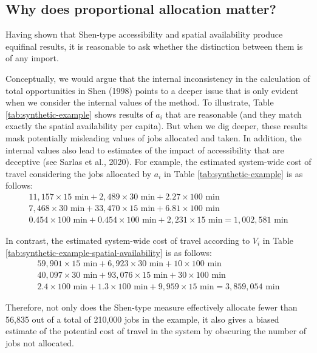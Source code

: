 \documentclass[]{elsarticle} %
\begin{document}
\hypertarget{why-does-proportional-allocation-matter}{%
\subsection{Why does proportional allocation
matter?}\label{why-does-proportional-allocation-matter}}

Having shown that Shen-type accessibility and spatial availability
produce equifinal results, it is reasonable to ask whether the
distinction between them is of any import.

Conceptually, we would argue that the internal inconsistency in the
calculation of total opportunities in Shen (1998) points to a deeper
issue that is only evident when we consider the internal values of the
method. To illustrate, Table \ref{tab:synthetic-example} shows results
of \(a_i\) that are reasonable (and they match exactly the spatial
availability per capita). But when we dig deeper, these results mask
potentially misleading values of jobs allocated and taken. In addition,
the internal values also lead to estimates of the impact of
accessibility that are deceptive (see Sarlas et al., 2020). For example,
the estimated system-wide cost of travel considering the jobs allocated
by \(a_i\) in Table \ref{tab:synthetic-example} is as follows: \[
\begin{array}{l}
11,157\times 15 \text{ min} + 2,489\times 30 \text{ min} + 2.27\times 100 \text{ min}\\
7,468\times 30 \text{ min} + 33,470\times 15 \text{ min} + 6.81\times 100 \text{ min}\\
0.454\times 100 \text{ min} + 0.454\times 100 \text{ min} + 2,231\times 15 \text{ min} = 1,002,581\text{ min}
\end{array}
\]

In contrast, the estimated system-wide cost of travel according to
\(V_i\) in Table \ref{tab:synthetic-example-spatial-availability} is as
follows: \[
\begin{array}{l}
59,901\times 15 \text{ min} + 6,923\times 30 \text{ min} + 10\times 100 \text{ min}\\
40,097\times 30 \text{ min} + 93,076\times 15 \text{ min} + 30\times 100 \text{ min}\\
2.4\times 100 \text{ min} + 1.3\times 100 \text{ min} + 9,959\times 15 \text{ min} = 3,859,054\text{ min}
\end{array}
\]

Therefore, not only does the Shen-type measure effectively allocate
fewer than 56,835 out of a total of 210,000 jobs in the example, it also
gives a biased estimate of the potential cost of travel in the system by
obscuring the number of jobs not allocated.
\end{document}
